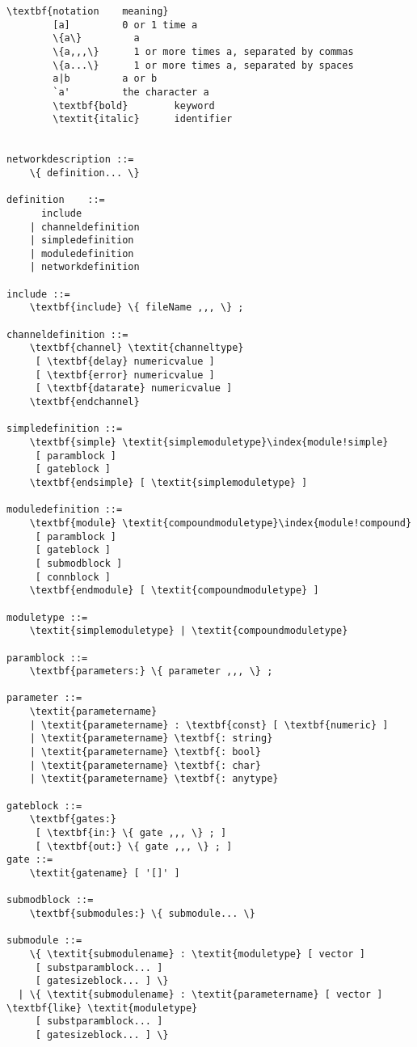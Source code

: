 \begin{Verbatim}[commandchars=\\\{\}]
        \textbf{notation    meaning}
        [a]         0 or 1 time a
        \{a\}         a
        \{a,,,\}      1 or more times a, separated by commas
        \{a...\}      1 or more times a, separated by spaces
        a|b         a or b
        `a'         the character a
        \textbf{bold}        keyword
        \textit{italic}      identifier


networkdescription ::=
    \{ definition... \}

definition    ::=
      include
    | channeldefinition
    | simpledefinition
    | moduledefinition
    | networkdefinition

include ::=
    \textbf{include} \{ fileName ,,, \} ;

channeldefinition ::=
    \textbf{channel} \textit{channeltype}
     [ \textbf{delay} numericvalue ]
     [ \textbf{error} numericvalue ]
     [ \textbf{datarate} numericvalue ]
    \textbf{endchannel}

simpledefinition ::=
    \textbf{simple} \textit{simplemoduletype}\index{module!simple}
     [ paramblock ]
     [ gateblock ]
    \textbf{endsimple} [ \textit{simplemoduletype} ]

moduledefinition ::=
    \textbf{module} \textit{compoundmoduletype}\index{module!compound}
     [ paramblock ]
     [ gateblock ]
     [ submodblock ]
     [ connblock ]
    \textbf{endmodule} [ \textit{compoundmoduletype} ]

moduletype ::=
    \textit{simplemoduletype} | \textit{compoundmoduletype}

paramblock ::=
    \textbf{parameters:} \{ parameter ,,, \} ;

parameter ::=
    \textit{parametername}
    | \textit{parametername} : \textbf{const} [ \textbf{numeric} ]
    | \textit{parametername} \textbf{: string}
    | \textit{parametername} \textbf{: bool}
    | \textit{parametername} \textbf{: char}
    | \textit{parametername} \textbf{: anytype}

gateblock ::=
    \textbf{gates:}
     [ \textbf{in:} \{ gate ,,, \} ; ]
     [ \textbf{out:} \{ gate ,,, \} ; ]
gate ::=
    \textit{gatename} [ '[]' ]

submodblock ::=
    \textbf{submodules:} \{ submodule... \}

submodule ::=
    \{ \textit{submodulename} : \textit{moduletype} [ vector ]
     [ substparamblock... ]
     [ gatesizeblock... ] \}
  | \{ \textit{submodulename} : \textit{parametername} [ vector ] \textbf{like} \textit{moduletype}
     [ substparamblock... ]
     [ gatesizeblock... ] \}


\end{Verbatim}
